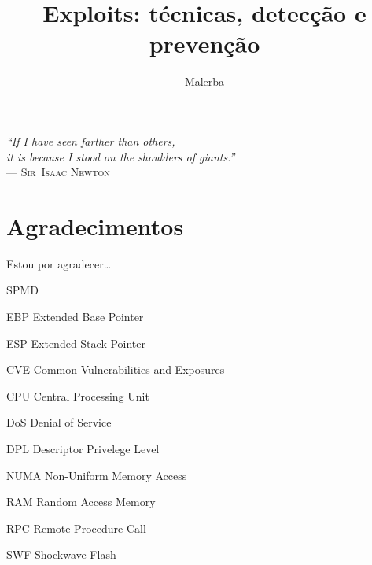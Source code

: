\documentclass[t]{iiufrgs}
\title{Exploits: técnicas, detecção e prevenção}
\author{Malerba}{César}
\begin{document}
\maketitle

\clearpage
\begin{flushright}
\mbox{}\vfill
{\sffamily\itshape
``If I have seen farther than others,\\
it is because I stood on the shoulders of giants.''\\}
--- \textsc{Sir~Isaac Newton}
\end{flushright}

\chapter*{Agradecimentos}
Estou por agradecer\ldots

\tableofcontents

\begin{listofabbrv}{SPMD}
        \item[EBP] Extended Base Pointer
		\item[ESP] Extended Stack Pointer
		\item[CVE] Common Vulnerabilities and Exposures
		\item[CPU] Central Processing Unit
		\item[DoS] Denial of Service
		\item[DPL] Descriptor Privelege Level
        \item[NUMA] Non-Uniform Memory Access
        \item[RAM] Random Access Memory
        \item[RPC] Remote Procedure Call
        \item[SWF] Shockwave Flash
\end{listofabbrv}


\listoffigures
\end{document}
